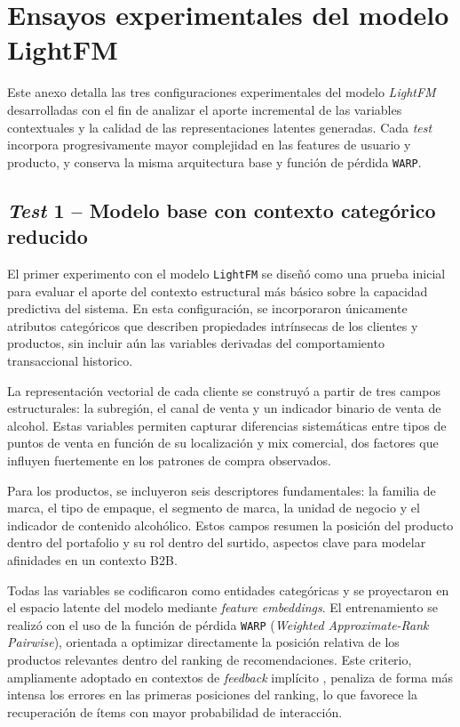 \chapter{Ensayos experimentales del modelo LightFM}
\label{AnexoLightFMTests}

Este anexo detalla las tres configuraciones experimentales del modelo \textit{LightFM} desarrolladas con el fin de analizar el aporte incremental de las variables contextuales y la calidad de las representaciones latentes generadas.  
Cada \textit{test} incorpora progresivamente mayor complejidad en las features de usuario y producto, y conserva la misma arquitectura base y función de pérdida \texttt{WARP}.

\section{\textit{Test} 1 – Modelo base con contexto categórico reducido}

El primer experimento con el modelo \texttt{LightFM} se diseñó como una prueba inicial para evaluar el aporte del contexto estructural más básico sobre la capacidad predictiva del sistema. En esta configuración, se incorporaron únicamente atributos categóricos que describen propiedades intrínsecas de los clientes y productos, sin incluir aún las variables derivadas del comportamiento transaccional historico.

La representación vectorial de cada cliente se construyó a partir de tres campos estructurales: la subregión, el canal de venta y un indicador binario de venta de alcohol. Estas variables permiten capturar diferencias sistemáticas entre tipos de puntos de venta en función de su localización y mix comercial, dos factores que influyen fuertemente en los patrones de compra observados.

Para los productos, se incluyeron seis descriptores fundamentales: la familia de marca, el tipo de empaque, el segmento de marca, la unidad de negocio y el indicador de contenido alcohólico. Estos campos resumen la posición del producto dentro del portafolio y su rol dentro del surtido, aspectos clave para modelar afinidades en un contexto B2B.

Todas las variables se codificaron como entidades categóricas y se proyectaron en el espacio latente del modelo mediante \textit{feature embeddings}. El entrenamiento se realizó con el uso de la función de pérdida \texttt{WARP} (\textit{Weighted Approximate-Rank Pairwise}), orientada a optimizar directamente la posición relativa de los productos relevantes dentro del ranking de recomendaciones. Este criterio, ampliamente adoptado en contextos de \textit{feedback} implícito \cite{ARTICLE:Rendle2009}, penaliza de forma más intensa los errores en las primeras posiciones del ranking, lo que favorece la recuperación de ítems con mayor probabilidad de interacción.

